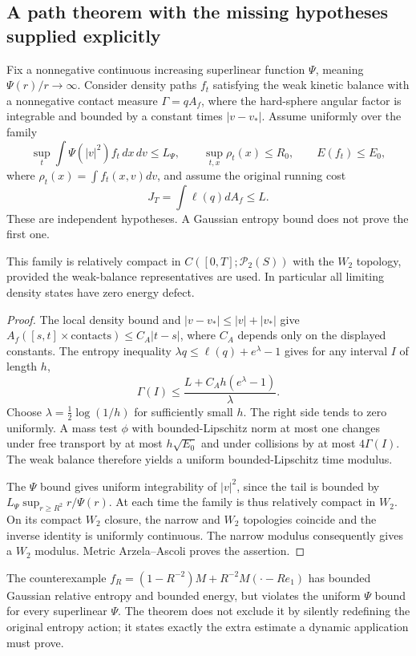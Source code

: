 \subsection{A path theorem with the missing hypotheses supplied explicitly}
Fix a nonnegative continuous increasing superlinear function $\Psi$, meaning $\Psi(r)/r\to\infty$. Consider density paths $f_t$ satisfying the weak kinetic balance with a nonnegative contact measure $\Gamma=qA_f$, where the hard-sphere angular factor is integrable and bounded by a constant times $|v-v_*|$. Assume uniformly over the family
\[
 \sup_t\int\Psi(|v|^2)f_t\,dx\,dv\le L_\Psi,\qquad
 \sup_{t,x}\rho_t(x)\le R_0,\qquad E(f_t)\le E_0,
\]
where $\rho_t(x)=\int f_t(x,v)dv$, and assume the original running cost
\[
 J_T=\int\ell(q)dA_f\le L.
\]
These are independent hypotheses. A Gaussian entropy bound does not prove the first one.

\begin{theorem}
\label{thm:r33-b4-compact}
This family is relatively compact in $C([0,T];\mathcal P_2(S))$ with the $W_2$ topology, provided the weak-balance representatives are used. In particular all limiting density states have zero energy defect.
\end{theorem}

\begin{proof}
The local density bound and $|v-v_*|\le|v|+|v_*|$ give
$A_f([s,t]\times\text{contacts})\le C_A|t-s|$, where $C_A$ depends only on the displayed constants. The entropy inequality $\lambda q\le\ell(q)+e^\lambda-1$ gives for any interval $I$ of length $h$,
\[
 \Gamma(I)\le\frac{L+C_Ah(e^\lambda-1)}\lambda.
\]
Choose $\lambda=\frac12\log(1/h)$ for sufficiently small $h$. The right side tends to zero uniformly. A mass test $\phi$ with bounded-Lipschitz norm at most one changes under free transport by at most $h\sqrt{E_0}$ and under collisions by at most $4\Gamma(I)$. The weak balance therefore yields a uniform bounded-Lipschitz time modulus.

The $\Psi$ bound gives uniform integrability of $|v|^2$, since the tail is bounded by $L_\Psi\sup_{r\ge R^2}r/\Psi(r)$. At each time the family is thus relatively compact in $W_2$. On its compact $W_2$ closure, the narrow and $W_2$ topologies coincide and the inverse identity is uniformly continuous. The narrow modulus consequently gives a $W_2$ modulus. Metric Arzela--Ascoli proves the assertion.
\end{proof}

The counterexample $f_R=(1-R^{-2})M+R^{-2}M(\cdot-Re_1)$ has bounded Gaussian relative entropy and bounded energy, but violates the uniform $\Psi$ bound for every superlinear $\Psi$. The theorem does not exclude it by silently redefining the original entropy action; it states exactly the extra estimate a dynamic application must prove.

